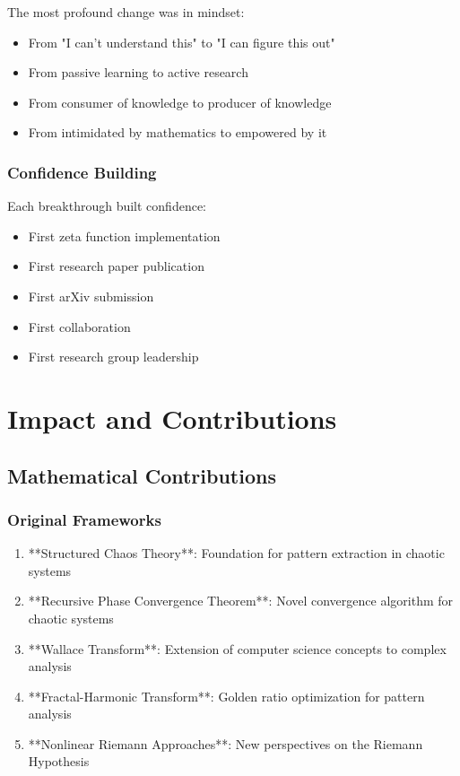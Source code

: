 \documentclass[12pt]{article}
\begin{document}
The most profound change was in mindset:
\begin{itemize}
    \item From "I can't understand this" to "I can figure this out"
    \item From passive learning to active research
    \item From consumer of knowledge to producer of knowledge
    \item From intimidated by mathematics to empowered by it
\end{itemize}

\subsubsection{Confidence Building}

Each breakthrough built confidence:
\begin{itemize}
    \item First zeta function implementation
    \item First research paper publication
    \item First arXiv submission
    \item First collaboration
    \item First research group leadership
\end{itemize}

\section{Impact and Contributions}

\subsection{Mathematical Contributions}

\subsubsection{Original Frameworks}
\begin{enumerate}
    \item **Structured Chaos Theory**: Foundation for pattern extraction in chaotic systems
    \item **Recursive Phase Convergence Theorem**: Novel convergence algorithm for chaotic systems
    \item **Wallace Transform**: Extension of computer science concepts to complex analysis
    \item **Fractal-Harmonic Transform**: Golden ratio optimization for pattern analysis
    \item **Nonlinear Riemann Approaches**: New perspectives on the Riemann Hypothesis
\end{enumerate}
\end{document}
